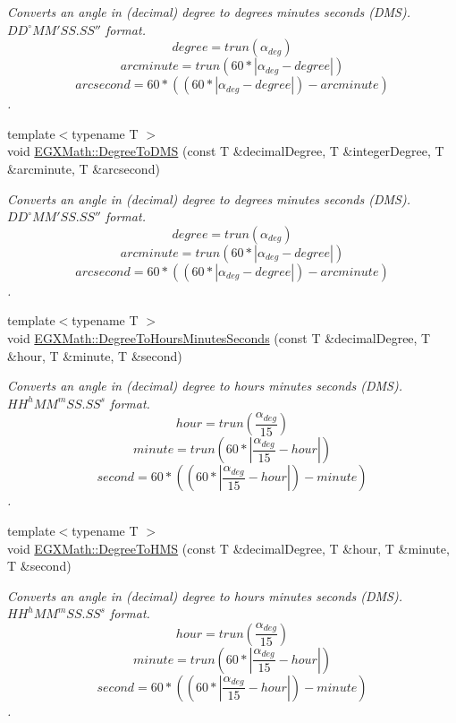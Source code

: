 \begin{DoxyCompactItemize}
\begin{DoxyCompactList}\small\item\em Converts an angle in (decimal) degree to degrees minutes seconds (D\+MS). ${DD}^{\circ}{MM}'{SS.SS}''$ format. \[degree=trun(\alpha_{deg})\] \[arcminute=trun(60 * |\alpha_{deg} - degree|)\] \[arcsecond=60 * ((60 * |\alpha_{deg} - degree|)-arcminute)\]. \end{DoxyCompactList}\item 
{\footnotesize template$<$typename T $>$ }\\void \mbox{\hyperlink{group___e_g_x_math-_angle_conversions-_degree_ga1096d04647918e20f61fb184ba2a7dce}{E\+G\+X\+Math\+::\+Degree\+To\+D\+MS}} (const T \&decimal\+Degree, T \&integer\+Degree, T \&arcminute, T \&arcsecond)
\begin{DoxyCompactList}\small\item\em Converts an angle in (decimal) degree to degrees minutes seconds (D\+MS). ${DD}^{\circ}{MM}'{SS.SS}''$ format. \[degree=trun(\alpha_{deg})\] \[arcminute=trun(60 * |\alpha_{deg} - degree|)\] \[arcsecond=60 * ((60 * |\alpha_{deg} - degree|)-arcminute)\]. \end{DoxyCompactList}\item 
{\footnotesize template$<$typename T $>$ }\\void \mbox{\hyperlink{group___e_g_x_math-_angle_conversions-_degree_ga770b13da33b6f6c7bfa398cca7f24dbe}{E\+G\+X\+Math\+::\+Degree\+To\+Hours\+Minutes\+Seconds}} (const T \&decimal\+Degree, T \&hour, T \&minute, T \&second)
\begin{DoxyCompactList}\small\item\em Converts an angle in (decimal) degree to hours minutes seconds (D\+MS). ${HH}^{h}{MM}^{m}{SS.SS}^{s}$ format. \[hour=trun(\frac{\alpha_{deg}}{15})\] \[minute=trun(60 * |\frac{\alpha_{deg}}{15} - hour|)\] \[second=60 * ((60 * |\frac{\alpha_{deg}}{15} - hour|)-minute)\]. \end{DoxyCompactList}\item 
{\footnotesize template$<$typename T $>$ }\\void \mbox{\hyperlink{group___e_g_x_math-_angle_conversions-_degree_ga0bb223ca6e77b00439a6d910ab32d82e}{E\+G\+X\+Math\+::\+Degree\+To\+H\+MS}} (const T \&decimal\+Degree, T \&hour, T \&minute, T \&second)
\begin{DoxyCompactList}\small\item\em Converts an angle in (decimal) degree to hours minutes seconds (D\+MS). ${HH}^{h}{MM}^{m}{SS.SS}^{s}$ format. \[hour=trun(\frac{\alpha_{deg}}{15})\] \[minute=trun(60 * |\frac{\alpha_{deg}}{15} - hour|)\] \[second=60 * ((60 * |\frac{\alpha_{deg}}{15} - hour|)-minute)\]. \end{DoxyCompactList}\item 

\end{DoxyCompactItemize}
